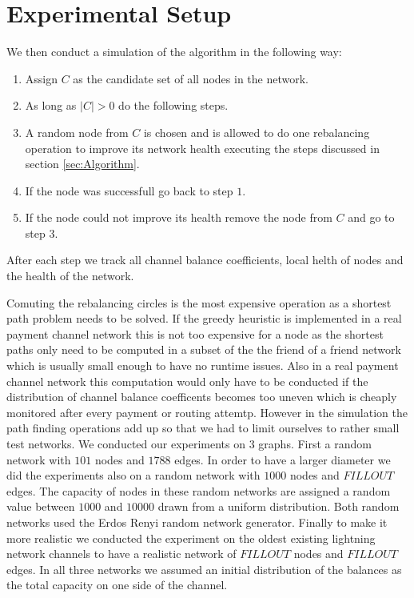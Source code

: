 \documentclass[a4paper]{paper}
\begin{document}
\section{Experimental Setup}\label{sec:setup}
We then conduct a simulation of the algorithm in the following way:
\begin{enumerate}
\item Assign $C$ as the candidate set of all nodes in the network.
\item As long as $|C| > 0$ do the following steps.
\item A random node from $C$ is chosen and is allowed to do one rebalancing operation to improve its network health executing the steps discussed in section \ref{sec:Algorithm}.
\item If the node was successfull go back to step $1$.
\item If the node could not improve its health remove the node from $C$ and go to step $3$.
\end{enumerate}
After each step we track all channel balance coefficients, local helth of nodes and the health of the network.

Comuting the rebalancing circles is the most expensive operation as a shortest path problem needs to be solved.
If the greedy heuristic is implemented in a real payment channel network this is not too expensive for a node as the shortest paths only need to be computed in a subset of the the friend of a friend network which is usually small enough to have no runtime issues.
Also in a real payment channel network this computation would only have to be conducted if the distribution of channel balance coefficents becomes too uneven which is cheaply monitored after every payment or routing attemtp.
However in the simulation the path finding operations add up so that we had to limit ourselves to rather small test networks.
We conducted our experiments on 3 graphs.
First a random network with $101$ nodes and $1788$ edges.
In order to have a larger diameter we did the experiments also on a random network with $1000$ nodes and $FILLOUT$ edges.
The capacity of nodes in these random networks are assigned a random value between $1000$ and $10000$ drawn from a uniform distribution.
Both random networks used the Erdos Renyi random network generator.
Finally to make it more realistic we conducted the experiment on the oldest existing lightning network channels to have a realistic network of $FILLOUT$ nodes and $FILLOUT$ edges.
In all three networks we assumed an initial distribution of the balances as the total capacity on one side of the channel.
\end{document}
